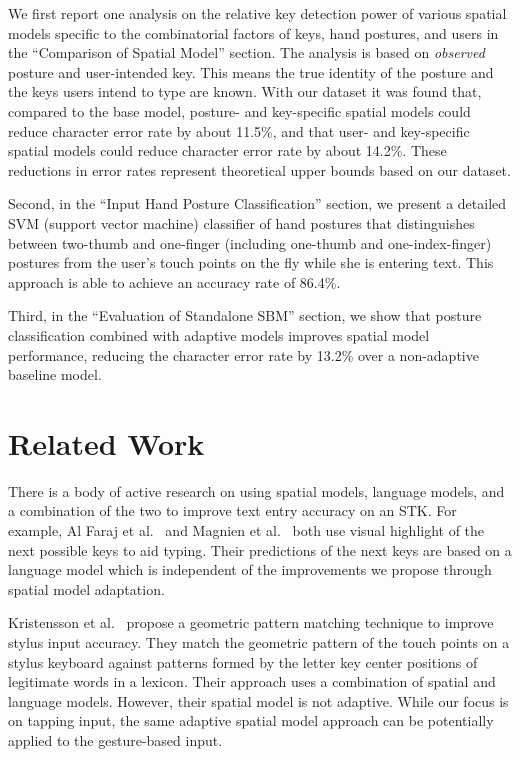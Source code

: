 \documentclass{sigchi}
\begin{document}
We first report one analysis on the 
relative key detection power of various spatial models specific to the 
combinatorial factors of keys, hand postures, and users in the ``Comparison of
Spatial Model'' section. The analysis is based on \textit{observed} posture and
user-intended key. This means the true
identity of the posture and the keys users intend to type are
known.
With our dataset it was found that, compared to
the base model, posture- and key-specific spatial models could reduce character
error rate by about 11.5\%, and that user- and key-specific spatial models could
reduce character error rate by about 14.2\%. These reductions in error rates
represent theoretical upper bounds based on our dataset.

Second, in the ``Input Hand Posture Classification'' section, we present a detailed 
SVM (support vector machine) classifier of hand postures that distinguishes between 
two-thumb and one-finger (including one-thumb and one-index-finger) postures
from the user's touch points on the fly while she is entering text. This
approach is able to achieve an accuracy rate of 86.4\%.

Third, in the ``Evaluation of Standalone SBM'' section, we show that posture
classification combined with adaptive models improves spatial model performance,
reducing the character error rate by 13.2\% over a non-adaptive baseline model.

\section{Related Work}

There is a body of active research on using spatial models, language models, and a combination
of the two to improve text entry accuracy on an STK. For example, 
Al Faraj et al.~\cite{AlFaraj:2009} and Magnien et al.~\cite{Magnien:2004} both use
visual highlight of the next possible keys to aid typing. Their predictions of the next keys are based on a language model which is independent of the improvements we propose through spatial model adaptation.

Kristensson et al.~\cite{Kristensson:2005} propose a geometric pattern matching technique to improve 
stylus input accuracy. They match the geometric pattern of the touch points on a stylus keyboard against patterns formed by 
the letter key center positions of legitimate words in a lexicon. 
Their approach uses a combination of spatial and language models. However, 
their spatial model is not adaptive. While our focus is on tapping input, the same adaptive spatial model approach
can be potentially applied to the gesture-based input.
\end{document}
